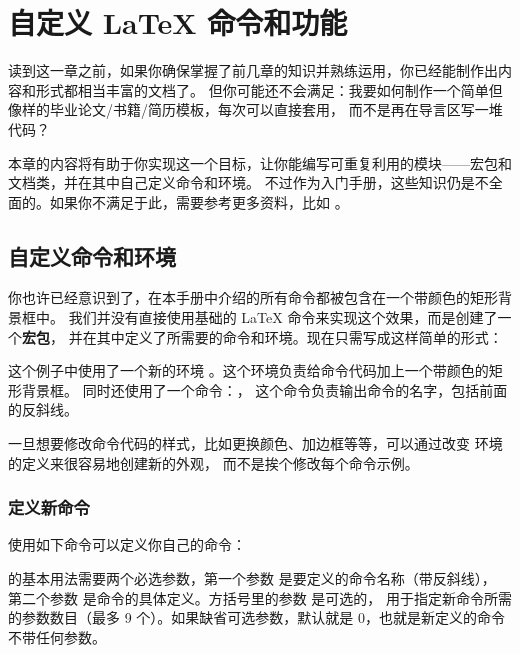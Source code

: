 \chapter{自定义 \LaTeX{} 命令和功能}\label{chap:custom}

\begin{intro}
读到这一章之前，如果你确保掌握了前几章的知识并熟练运用，你已经能制作出内容和形式都相当丰富的文档了。
但你可能还不会满足：我要如何制作一个简单但像样的毕业论文/书籍/简历模板，每次可以直接套用，
而不是再在导言区写一堆代码？

本章的内容将有助于你实现这一个目标，让你能编写可重复利用的模块——宏包和文档类，并在其中自己定义命令和环境。
不过作为入门手册，这些知识仍是不全面的。如果你不满足于此，需要参考更多资料，比如 \cite{companion,clsguide}。
\end{intro}

\section{自定义命令和环境}\label{sec:defs}

你也许已经意识到了，在本手册中介绍的所有命令都被包含在一个带颜色的矩形背景框中。
我们并没有直接使用基础的 \LaTeX{} 命令来实现这个效果，而是创建了一个\textbf{宏包}，
并在其中定义了所需要的命令和环境。现在只需写成这样简单的形式：

\begin{example}
\begin{command}
\end{command}
\end{example}

这个例子中使用了一个新的环境 。这个环境负责给命令代码加上一个带颜色的矩形背景框。
同时还使用了一个命令：， 这个命令负责输出命令的名字，包括前面的反斜线。

一旦想要修改命令代码的样式，比如更换颜色、加边框等等，可以通过改变  环境的定义来很容易地创建新的外观，
而不是挨个修改每个命令示例。

\subsection{定义新命令}\label{subsec:newcmd}

使用如下命令可以定义你自己的命令：
\begin{command}
\end{command}
 的基本用法需要两个必选参数，第一个参数  是要定义的命令名称（带反斜线），
第二个参数  是命令的具体定义。方括号里的参数  是可选的，
用于指定新命令所需的参数数目（最多 9 个）。如果缺省可选参数，默认就是 0，也就是新定义的命令不带任何参数。

